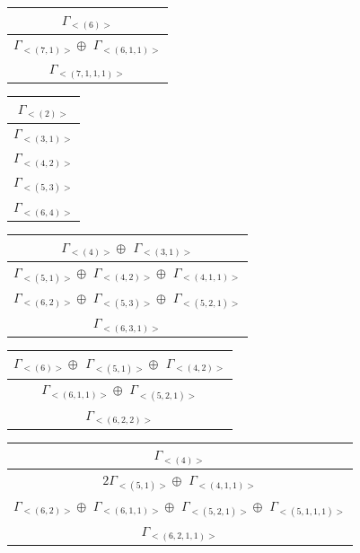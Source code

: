 \begin{minipage}{.3\textwidth}
\centering
\begin{tabular}{|c|}\hline
$\Gamma_{<(
6
)>}$
\\ \hline
$\Gamma_{<(
7 , 
1
)>} \oplus$
$\Gamma_{<(
6 , 
1 , 
1
)>}$
\\ \hline
$\Gamma_{<(
7 , 
1 , 
1 , 
1
)>}$
\\
\hline\end{tabular}\end{minipage}
\begin{minipage}{.3\textwidth}
\centering
\begin{tabular}{|c|}\hline
$\Gamma_{<(
2
)>}$
\\ \hline
$\Gamma_{<(
3 , 
1
)>}$
\\ \hline
$\Gamma_{<(
4 , 
2
)>}$
\\ \hline
$\Gamma_{<(
5 , 
3
)>}$
\\ \hline
$\Gamma_{<(
6 , 
4
)>}$
\\
\hline\end{tabular}\end{minipage}
\bigskip
\begin{minipage}{.5\textwidth}
\centering
\begin{tabular}{|c|}\hline
$\Gamma_{<(
4
)>} \oplus$
$\Gamma_{<(
3 , 
1
)>}$
\\ \hline
$\Gamma_{<(
5 , 
1
)>} \oplus$
$\Gamma_{<(
4 , 
2
)>} \oplus$
$\Gamma_{<(
4 , 
1 , 
1
)>}$
\\ \hline
$\Gamma_{<(
6 , 
2
)>} \oplus$
$\Gamma_{<(
5 , 
3
)>} \oplus$
$\Gamma_{<(
5 , 
2 , 
1
)>}$
\\ \hline
$\Gamma_{<(
6 , 
3 , 
1
)>}$
\\
\hline\end{tabular}\end{minipage}
\begin{minipage}{.5\textwidth}
\centering
\begin{tabular}{|c|}\hline
$\Gamma_{<(
6
)>} \oplus$
$\Gamma_{<(
5 , 
1
)>} \oplus$
$\Gamma_{<(
4 , 
2
)>}$
\\ \hline
$\Gamma_{<(
6 , 
1 , 
1
)>} \oplus$
$\Gamma_{<(
5 , 
2 , 
1
)>}$
\\ \hline
$\Gamma_{<(
6 , 
2 , 
2
)>}$
\\
\hline\end{tabular}\end{minipage}
\bigskip
\begin{minipage}{1\textwidth}
\centering
\begin{tabular}{|c|}\hline
$\Gamma_{<(
4
)>}$
\\ \hline
$ 2 \Gamma_{<(
5 , 
1
)>} \oplus$
$\Gamma_{<(
4 , 
1 , 
1
)>}$
\\ \hline
$\Gamma_{<(
6 , 
2
)>} \oplus$
$\Gamma_{<(
6 , 
1 , 
1
)>} \oplus$
$\Gamma_{<(
5 , 
2 , 
1
)>} \oplus$
$\Gamma_{<(
5 , 
1 , 
1 , 
1
)>}$
\\ \hline
$\Gamma_{<(
6 , 
2 , 
1 , 
1
)>}$
\\
\hline\end{tabular}\end{minipage}
